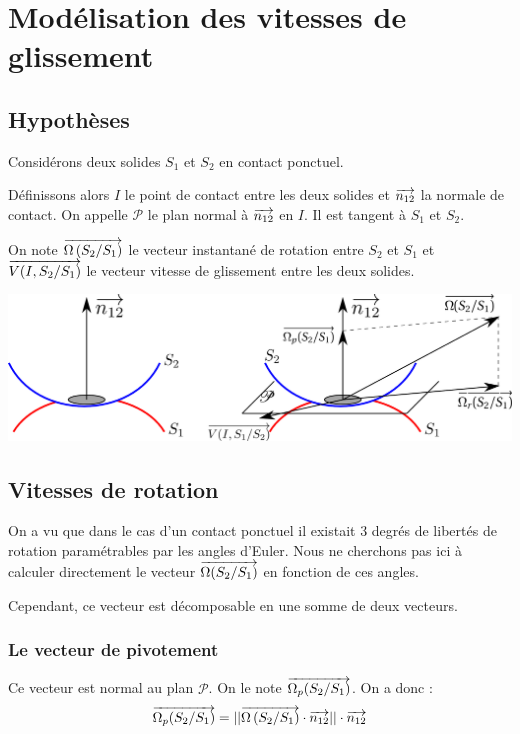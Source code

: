 \documentclass[10pt,oneside]{article}
\begin{document}
\section{Modélisation des vitesses de glissement}
\subsection{Hypothèses}
Considérons deux solides $S_1$ et $S_2$ en contact ponctuel. 

Définissons alors $I$ le point de contact entre les deux solides et $\overrightarrow{n_{12}}$ la normale de contact. On appelle $\mathcal{P}$ le plan normal à $\overrightarrow{n_{12}}$ en $I$. Il est tangent à $S_1$ et $S_2$. 

On note $\overrightarrow{\Omega\left( {S_2}/{S_1}\right)}$ le vecteur instantané de rotation entre $S_2$ et $S_1$ et $\overrightarrow{V(I,S_2/S_1)}$ le vecteur vitesse de glissement entre les deux solides.


\begin{center}
\includegraphics[width=.8\textwidth]{png/ContactReel} 
\end{center}

\subsection{Vitesses de rotation}
On a vu que dans le cas d'un contact ponctuel il existait 3 degrés de libertés de rotation paramétrables par les angles d'Euler. Nous ne cherchons pas ici à calculer directement le vecteur $\overrightarrow{\Omega(S_2/S_1)}$ en fonction de ces angles.

Cependant, ce vecteur est décomposable en une somme de deux vecteurs.
\subsubsection*{Le vecteur de pivotement}
Ce vecteur est normal au plan $\mathcal{P}$. On le note $\overrightarrow{\Omega_p(S_2/S_1)}$. On a donc :
$$
\overrightarrow{\Omega_p(S_2/S_1)} = ||\overrightarrow{\Omega\left( {S_2}/{S_1}\right)}\cdot \overrightarrow{n_{12}}||\cdot \overrightarrow{n_{12}}
$$
\end{document}
